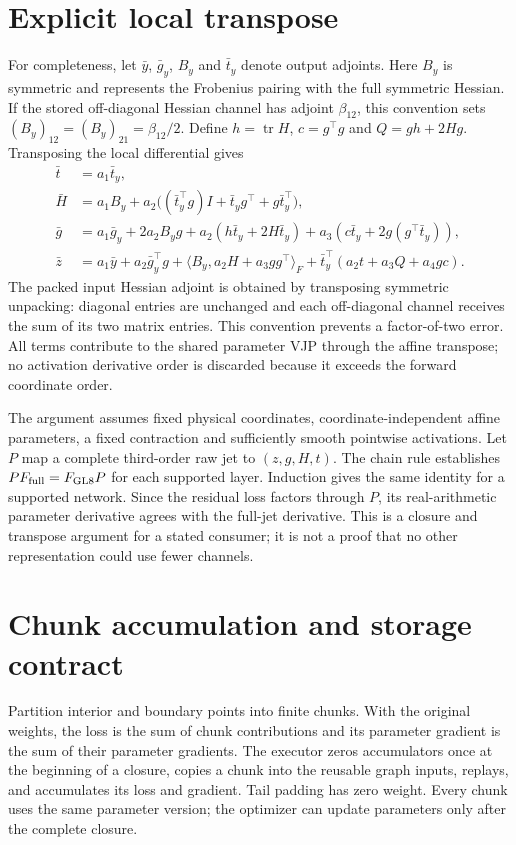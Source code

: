 \documentclass[11pt]{article}
\begin{document}
\appendix

\section{Explicit local transpose}\label{app:transpose}
For completeness, let $\bar y$, $\bar g_y$, $B_y$ and $\bar t_y$ denote
output adjoints. Here $B_y$ is symmetric and represents the Frobenius
pairing with the full symmetric Hessian. If the stored off-diagonal
Hessian channel has adjoint $\beta_{12}$, this convention sets
$(B_y)_{12}=(B_y)_{21}=\beta_{12}/2$. Define $h=\operatorname{tr}H$,
$c=g^\top g$ and $Q=gh+2Hg$. Transposing the local differential gives
\begin{align}
\bar t&=a_1\bar t_y,\\
\bar H&=a_1 B_y+a_2\big((\bar t_y^\top g)I+
                 \bar t_y g^\top+g\bar t_y^\top\big),\\
\bar g&=a_1\bar g_y+2a_2B_y g
          +a_2(h\bar t_y+2H\bar t_y)
          +a_3(c\bar t_y+2g(g^\top\bar t_y)),\\
\bar z&=a_1\bar y+a_2\bar g_y^\top g
          +\langle B_y,a_2H+a_3gg^\top\rangle_F
          +\bar t_y^\top(a_2t+a_3Q+a_4gc).
\end{align}
The packed input Hessian adjoint is obtained by transposing symmetric
unpacking: diagonal entries are unchanged and each off-diagonal channel
receives the sum of its two matrix entries. This convention prevents a
factor-of-two error. All terms contribute to the shared parameter VJP
through the affine transpose; no activation derivative order is discarded
because it exceeds the forward coordinate order.

The argument assumes fixed physical coordinates, coordinate-independent
affine parameters, a fixed contraction and sufficiently smooth pointwise
activations. Let $P$ map a complete third-order raw jet to $(z,g,H,t)$.
The chain rule establishes $P F_{\rm full}=F_{\rm GL8}P$ for each supported
layer. Induction gives the same identity for a supported network. Since
the residual loss factors through $P$, its real-arithmetic parameter
derivative agrees with the full-jet derivative. This is a closure and
transpose argument for a stated consumer; it is not a proof that no other
representation could use fewer channels.

\section{Chunk accumulation and storage contract}\label{app:chunk}
Partition interior and boundary points into finite chunks. With the
original weights, the loss is the sum of chunk contributions and its
parameter gradient is the sum of their parameter gradients. The executor
zeros accumulators once at the beginning of a closure, copies a chunk into
the reusable graph inputs, replays, and accumulates its loss and gradient.
Tail padding has zero weight. Every chunk uses the same parameter version;
the optimizer can update parameters only after the complete closure.
\end{document}

